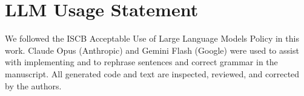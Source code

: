 \section*{LLM Usage Statement}
\label{sec:llm-disclosure}
We followed the ISCB Acceptable Use of Large Language Models Policy in this work. Claude Opus (Anthropic) and Gemini Flash (Google) were used to assist with implementing \tool and to rephrase sentences and correct grammar in the manuscript.
All generated code and text are inspected, reviewed, and corrected by the authors.